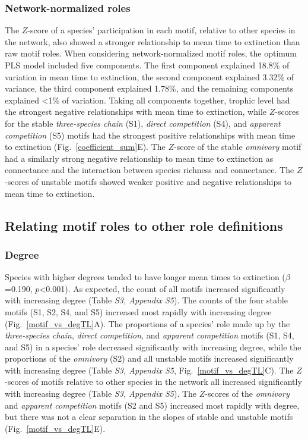\documentclass[12pt]{article}
\begin{document}
\begin{spacing}{2.0}
        \subsubsection*{Network-normalized roles}
        
    		The $Z$-score of a species' participation in each motif, relative to other species in the network, also showed a stronger relationship to mean time to extinction than raw motif roles.
    		When considering network-normalized motif roles, the optimum PLS model included five components.
    		The first component explained 18.8\% of variation in mean time to extinction, the second component explained 3.32\% of variance, the third component explained 1.78\%, and the remaining components explained \textless1\% of variation.
    		Taking all components together, trophic level had the strongest negative relationships  with mean time to extinction, while $Z$-scores for the stable \emph{three-species chain} (S1), \emph{direct competition} (S4), and \emph{apparent competition} (S5) motifs had the strongest positive relationships with mean time to extinction (Fig.~\ref{coefficient_sum}E). 
    		The $Z$-score of the stable \emph{omnivory} motif had a similarly strong negative relationship to mean time to extinction as connectance and the interaction between species richness and connectance.
    		The $Z$-scores of unstable motifs showed weaker positive and negative relationships to mean time to extinction.
    		

	\subsection*{Relating motif roles to other role definitions}

        \subsubsection*{Degree}
        
            Species with higher degrees tended to have longer mean times to extinction ($\beta$=0.190, $p$\textless0.001).
    		As expected, the count of all motifs increased significantly with increasing degree (Table \emph{S3, Appendix S5}).
    		The counts of the four stable motifs (S1, S2, S4, and S5) increased most rapidly with increasing degree (Fig.~\ref{motif_vs_degTL}A).
    		The proportions of a species' role made up by the \emph{three-species chain}, \emph{direct competition}, and \emph{apparent competition} motifs (S1, S4, and S5) in a species' role decreased significantly with increasing degree, while the proportions of the \emph{omnivory} (S2) and all unstable motifs increased significantly with increasing degree (Table \emph{S3, Appendix S5}, Fig.~\ref{motif_vs_degTL}C).
    		The $Z$-scores of motifs relative to other species in the network all increased significantly with increasing degree (Table \emph{S3, Appendix S5}).
            The $Z$-scores of the \emph{omnivory} and \emph{apparent competition} motifs (S2 and S5) increased most rapidly with degree, but there was not a clear separation in the slopes of stable and unstable motifs (Fig.~\ref{motif_vs_degTL}E).



\end{spacing}
\end{document}
